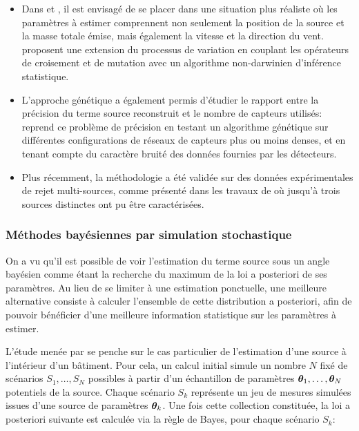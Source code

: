  \begin{itemize}
 	\item Dans \cite{Allen2007} et \cite{Haupt2007}, il est envisagé de se placer dans une situation plus réaliste où les paramètres à estimer comprennent non seulement la position de la source et la masse totale émise, mais également la vitesse et la direction du vent. \cite{Cervone2011} proposent une extension du processus de variation en couplant les opérateurs de croisement et de mutation avec un algorithme non-darwinien d'inférence statistique.
 \item L'approche génétique a également permis d'étudier le rapport entre la précision du terme source reconstruit et le nombre de capteurs utilisés: \cite{Long2010} reprend ce problème de précision en testant un algorithme génétique sur différentes configurations de réseaux de capteurs plus ou moins denses, et en tenant compte du caractère bruité des données fournies par les détecteurs. 
 \item Plus récemment, la méthodologie a été validée sur des données expérimentales de rejet multi-sources, comme présenté dans les travaux de \cite{Cantelli2015} où jusqu'à trois sources distinctes ont pu être caractérisées.\\
 \end{itemize}
 
 \subsubsection{Méthodes bayésiennes par simulation stochastique}
 
 On a vu qu'il est possible de voir l'estimation du terme source sous un angle bayésien  comme étant la recherche du maximum  de la loi a posteriori de ses paramètres. Au lieu de se limiter à une estimation ponctuelle, une meilleure alternative consiste à calculer l'ensemble de cette distribution a posteriori, afin de pouvoir bénéficier d'une meilleure information statistique sur les paramètres à estimer. 
 
 L'étude menée par \cite{Sohn2002} se penche sur le cas particulier de l'estimation d'une source à l'intérieur d'un bâtiment. Pour cela, un calcul initial simule un nombre $N$ fixé de scénarios $S_1,\dots,S_N$ possibles à partir d'un échantillon de paramètres ${\bm{\theta}}_1, \dots, {\bm{\theta}}_N$ potentiels de la source. Chaque scénario $S_k$ représente un jeu de mesures simulées issues d'une source de paramètres ${\bm{\theta}}_k$. Une fois cette collection constituée, la loi a posteriori suivante est calculée via la règle de Bayes, pour chaque scénario $S_k$:
 
